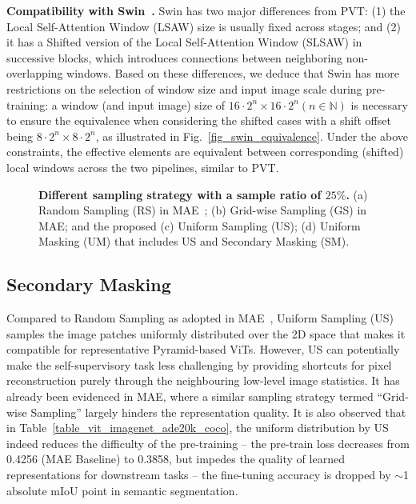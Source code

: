 \documentclass{article}
\begin{document}
\textbf{Compatibility with Swin~\cite{liu2021swin}.} Swin has two major differences from PVT: (1) the Local Self-Attention Window (LSAW) size is usually fixed across stages; and (2) it has a Shifted version of the Local Self-Attention Window (SLSAW) in successive blocks, which introduces connections between neighboring non-overlapping windows. Based on these differences, we deduce that Swin has more restrictions on the selection of window size and input image scale during pre-training: a window (and input image) size of $16\cdot 2^n \times 16\cdot 2^n (n \in \mathbb{N})$ is necessary to ensure the equivalence when considering the shifted cases with a shift offset being $8\cdot 2^n \times 8\cdot 2^n$, as illustrated in Fig.~\ref{fig_swin_equivalence}. Under the above constraints, the effective elements are equivalent between corresponding (shifted) local windows across the two pipelines, similar to PVT.



\begin{figure}[t]
	\vspace{0pt}
	\begin{center}
		\setlength{\fboxrule}{0pt}
	\end{center}	
	\vspace{-10pt}
	\caption{\textbf{Different sampling strategy with a sample ratio of $25\%$.} (a) Random Sampling (RS) in MAE~\cite{he2021masked}; (b) Grid-wise Sampling (GS) in MAE; and the proposed (c) Uniform Sampling (US); (d) Uniform Masking (UM) that includes US and Secondary Masking (SM).
	}
	\label{fig_sampling_type}
	\vspace{-6pt}
\end{figure}


\subsection{Secondary Masking}
Compared to Random Sampling as adopted in MAE~\cite{he2021masked}, Uniform Sampling (US) samples the image patches uniformly distributed over the 2D space that makes it compatible for representative Pyramid-based ViTs. However, 
US can potentially make the self-supervisory task less challenging by providing shortcuts for pixel reconstruction purely through the neighbouring low-level image statistics.
It has already been evidenced in MAE, where a similar sampling strategy termed ``Grid-wise Sampling'' largely hinders the representation quality. It is also observed that in Table~\ref{table_vit_imagenet_ade20k_coco}, the uniform distribution by US indeed reduces the difficulty of the pre-training 
-- the pre-train loss decreases from 0.4256 (MAE Baseline) to 0.3858, but impedes the quality of learned representations for downstream tasks -- the fine-tuning accuracy is dropped by $\sim$1 absolute mIoU point in semantic segmentation.
\end{document}
